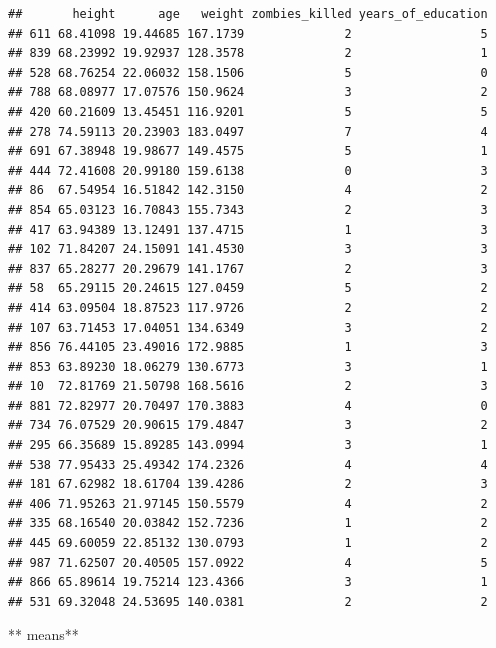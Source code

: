 \documentclass[]{article}
\newenvironment{Shaded}{\begin{snugshade}}{\end{snugshade}}
\newcommand{\KeywordTok}[1]{\textcolor[rgb]{0.13,0.29,0.53}{\textbf{#1}}}
\newcommand{\StringTok}[1]{\textcolor[rgb]{0.31,0.60,0.02}{#1}}
\newcommand{\OperatorTok}[1]{\textcolor[rgb]{0.81,0.36,0.00}{\textbf{#1}}}
\newcommand{\NormalTok}[1]{#1}
\begin{document}
\begin{verbatim}
##       height      age   weight zombies_killed years_of_education
## 611 68.41098 19.44685 167.1739              2                  5
## 839 68.23992 19.92937 128.3578              2                  1
## 528 68.76254 22.06032 158.1506              5                  0
## 788 68.08977 17.07576 150.9624              3                  2
## 420 60.21609 13.45451 116.9201              5                  5
## 278 74.59113 20.23903 183.0497              7                  4
## 691 67.38948 19.98677 149.4575              5                  1
## 444 72.41608 20.99180 159.6138              0                  3
## 86  67.54954 16.51842 142.3150              4                  2
## 854 65.03123 16.70843 155.7343              2                  3
## 417 63.94389 13.12491 137.4715              1                  3
## 102 71.84207 24.15091 141.4530              3                  3
## 837 65.28277 20.29679 141.1767              2                  3
## 58  65.29115 20.24615 127.0459              5                  2
## 414 63.09504 18.87523 117.9726              2                  2
## 107 63.71453 17.04051 134.6349              3                  2
## 856 76.44105 23.49016 172.9885              1                  3
## 853 63.89230 18.06279 130.6773              3                  1
## 10  72.81769 21.50798 168.5616              2                  3
## 881 72.82977 20.70497 170.3883              4                  0
## 734 76.07529 20.90615 179.4847              3                  2
## 295 66.35689 15.89285 143.0994              3                  1
## 538 77.95433 25.49342 174.2326              4                  4
## 181 67.62982 18.61704 139.4286              2                  3
## 406 71.95263 21.97145 150.5579              4                  2
## 335 68.16540 20.03842 152.7236              1                  2
## 445 69.60059 22.85132 130.0793              1                  2
## 987 71.62507 20.40505 157.0922              4                  5
## 866 65.89614 19.75214 123.4366              3                  1
## 531 69.32048 24.53695 140.0381              2                  2
\end{verbatim}

** means**

\begin{Shaded}
\end{Shaded}
\end{document}
